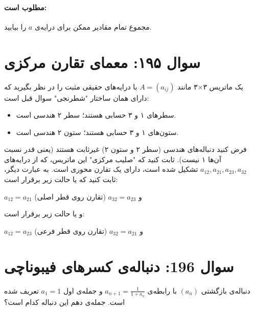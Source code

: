 \documentclass[12pt]{article}
\begin{document}
\paragraph{مطلوب است:}
مجموع تمام مقادیر ممکن برای درایه‌ی \(a\) را بیابید.




\vspace{1cm}
\hrulefill
\vspace{1cm}



\section*{سوال ۱۹۵: معمای تقارن مرکزی}
یک ماتریس ۳×۳ مانند \(A = (a_{ij})\) با درایه‌های حقیقی مثبت را در نظر بگیرید که دارای همان ساختار "شطرنجی" سوال قبل است:
\begin{itemize}
	\item سطرهای ۱ و ۳ حسابی هستند؛ سطر ۲ هندسی است.
	\item ستون‌های ۱ و ۳ حسابی هستند؛ ستون ۲ هندسی است.
\end{itemize}
فرض کنید دنباله‌های هندسی (سطر ۲ و ستون ۲) غیرثابت هستند (یعنی قدر نسبت آن‌ها ۱ نیست).
\vspace{0.5cm}
ثابت کنید که "صلیب مرکزی" این ماتریس، که از درایه‌های \(a_{12}, a_{21}, a_{23}, a_{32}\) تشکیل شده است، دارای یک تقارن محوری است. به عبارت دیگر، ثابت کنید که یا حالت زیر برقرار است:
\begin{center}
	\( a_{12} = a_{21} \) \quad و \quad \( a_{32} = a_{23} \) \quad (تقارن روی قطر اصلی)
\end{center}
و یا حالت زیر برقرار است:
\begin{center}
	\( a_{12} = a_{23} \) \quad و \quad \( a_{32} = a_{21} \) \quad (تقارن روی قطر فرعی)
\end{center}


\vspace{1cm}
\hrulefill
\vspace{1cm}

\section*{سوال 196: دنباله‌ی کسرهای فیبوناچی}
دنباله‌ی بازگشتی \( (a_n) \) با رابطه‌ی \( a_{n+1} = \frac{1}{1+a_n} \) و جمله‌ی اول \( a_1 = 1 \) تعریف شده است. جمله‌ی دهم این دنباله کدام است؟
\end{document}
